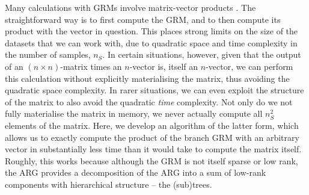 

Many calculations with GRMs involve matrix-vector products
\citep{colleau2002indirect, colleau2017fast}. The straightforward way is
to first compute the GRM, and to then compute its product with 
the vector in question. This places strong limits on the size of the 
datasets that we can work with, due to quadratic space and time complexity
in the number of samples, $n_S$.
In certain situations, however, 
given that the output of an $(n\times n)$-matrix times an $n$-vector is,
itself an $n$-vector, we can perform this calculation without explicitly
materialising the matrix, thus avoiding the quadratic space complexity.
In rarer situations, we can even exploit the structure of the matrix to 
also avoid the quadratic \emph{time} complexity. Not only do we not fully
materialise the matrix in memory, we never actually compute all $n_S^2$
elements of the matrix. Here, we develop an algorithm of the 
latter form, which allows us to exactly compute the product of the 
branch GRM with an arbitrary vector in substantially less time than
it would take to compute the matrix itself.
Roughly, this works because although the GRM is not itself sparse or low rank,
the ARG provides a decomposition of the ARG into a sum
of low-rank components with hierarchical structure -- the (sub)trees.

